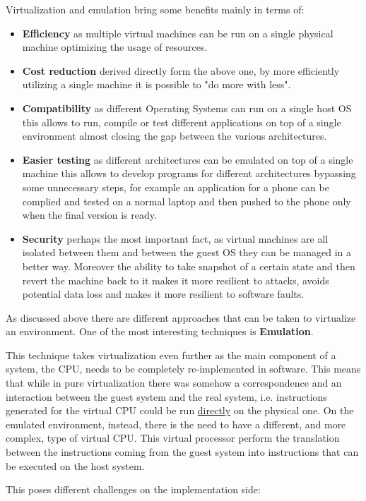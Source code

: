 Virtualization and emulation bring some benefits mainly in terms of:
\begin{itemize}
    \item \textbf{Efficiency} as multiple virtual machines can be run on a single physical machine optimizing the usage of resources.
    \item \textbf{Cost reduction} derived directly form the above one, by more efficiently utilizing a single machine it is possible to "do more with less".
    \item \textbf{Compatibility} as different Operating Systems can run on a single host OS this allows to run, compile or test different applications on top of a single environment almost closing the gap between the various architectures.
    \item \textbf{Easier testing} as different architectures can be emulated on top of a single machine this allows to develop programs for different architectures bypassing some unnecessary steps, for example an application for a phone can be complied and tested on a normal laptop and then pushed to the phone only when the final version is ready.
    \item \textbf{Security} perhaps the most important fact, as virtual machines are all isolated between them and between the guest OS they can be managed in a better way. Moreover the ability to take snapshot of a certain state and then revert the machine back to it makes it more resilient to attacks, avoids potential data loss and makes it more resilient to software faults. 
\end{itemize}

As discussed above there are different approaches that can be taken to virtualize an environment. One of the most interesting techniques is \textbf{Emulation}. 

This technique takes virtualization even further as the main component of a system, the CPU, needs to be completely re-implemented in software. This means that while in pure virtualization there was somehow a correspondence and an interaction between the guest system and the real system, i.e. instructions generated for the virtual CPU could be run \underline{directly} on the physical one. On the emulated environment, instead, there is the need to have a different, and more complex, type of virtual CPU. This virtual processor perform the translation between the instructions coming from the guest system into instructions that can be executed on the host system.

This poses different challenges on the implementation side: 


